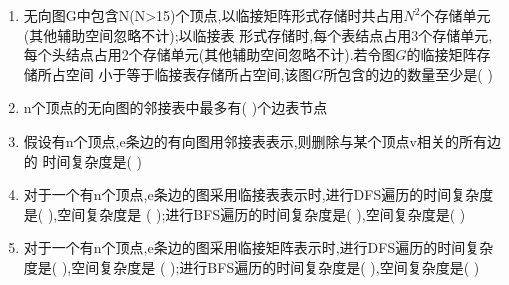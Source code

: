 \documentclass[12pt, a4paper, oneside, UTF8]{ctexbook}
\begin{document}
\begin{enumerate}

    \item 无向图G中包含N(N>15)个顶点,以临接矩阵形式存储时共占用$N^2$个存储单元(其他辅助空间忽略不计);以临接表
    形式存储时,每个表结点占用3个存储单元,每个头结点占用2个存储单元(其他辅助空间忽略不计).若令图$G$的临接矩阵存储所占空间
    小于等于临接表存储所占空间,该图$G$所包含的边的数量至少是(   ) \\


    \item n个顶点的无向图的邻接表中最多有(   )个边表节点
    
    \item 假设有n个顶点,e条边的有向图用邻接表表示,则删除与某个顶点v相关的所有边的
    时间复杂度是(    ) 


    \item 对于一个有n个顶点,e条边的图采用临接表表示时,进行DFS遍历的时间复杂度是(   ),空间复杂度是
    (   );进行BFS遍历的时间复杂度是(   ),空间复杂度是(    ) 

    \item 对于一个有n个顶点,e条边的图采用临接矩阵表示时,进行DFS遍历的时间复杂度是(   ),空间复杂度是
    (   );进行BFS遍历的时间复杂度是(   ),空间复杂度是(    ) 


\end{enumerate}
\end{document}
